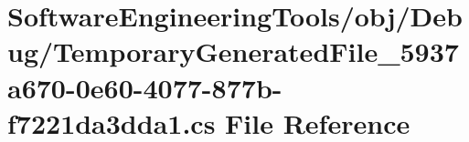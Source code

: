 \hypertarget{_software_engineering_tools_2obj_2_debug_2_temporary_generated_file__5937a670-0e60-4077-877b-f7221da3dda1_8cs}{\section{Software\+Engineering\+Tools/obj/\+Debug/\+Temporary\+Generated\+File\+\_\+5937a670-\/0e60-\/4077-\/877b-\/f7221da3dda1.cs File Reference}
\label{_software_engineering_tools_2obj_2_debug_2_temporary_generated_file__5937a670-0e60-4077-877b-f7221da3dda1_8cs}
}
